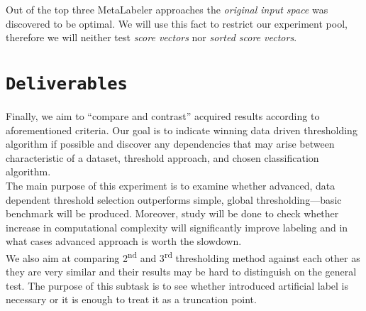 \documentclass[12pt,a4paper,twocolumn]{article}
\newcommand{\ts}{\textsuperscript}
\begin{document}
Out of the top three MetaLabeler approaches the \emph{original input space} was discovered to be optimal. We will use this fact to restrict our experiment pool, therefore we will neither test \emph{score vectors} nor \emph{sorted score vectors}.\\

\section*{\texttt{Deliverables}}
Finally, we aim to ``compare and contrast'' acquired results according to aforementioned criteria. Our goal is to indicate winning data driven thresholding algorithm if possible and discover any dependencies that may arise between characteristic of a dataset, threshold approach, and chosen classification algorithm.\\

The main purpose of this experiment is to examine whether advanced, data dependent threshold selection outperforms simple, global thresholding---basic benchmark will be produced. Moreover, study will be done to check whether increase in computational complexity will significantly improve labeling and in what cases advanced approach is worth the slowdown.\\

We also aim at comparing 2\ts{nd} and 3\ts{rd} thresholding method against each other as they are very similar and their results may be hard to distinguish on the general test. The purpose of this subtask is to see whether introduced artificial label is necessary or it is enough to treat it as a truncation point.\\


\end{document}
